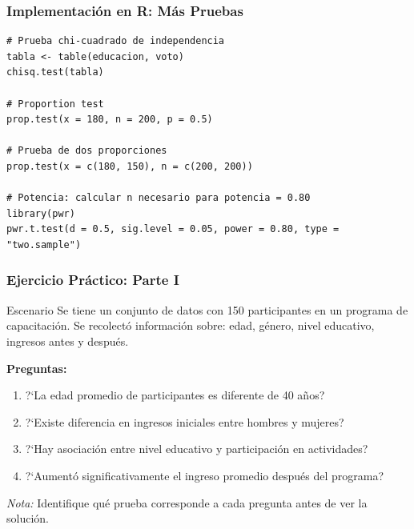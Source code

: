 \documentclass[aspectratio=169,11pt]{beamer}
\begin{document}
\begin{frame}[fragile]
  \frametitle{Implementaci\'on en R: M\'as Pruebas}
  \tiny
  \begin{lstlisting}
# Prueba chi-cuadrado de independencia
tabla <- table(educacion, voto)
chisq.test(tabla)

# Proportion test
prop.test(x = 180, n = 200, p = 0.5)

# Prueba de dos proporciones
prop.test(x = c(180, 150), n = c(200, 200))

# Potencia: calcular n necesario para potencia = 0.80
library(pwr)
pwr.t.test(d = 0.5, sig.level = 0.05, power = 0.80, type = "two.sample")
  \end{lstlisting}
\end{frame}

\begin{frame}
  \frametitle{Ejercicio Pr\'actico: Parte I}
  \small
  \begin{exampleblock}{Escenario}
    Se tiene un conjunto de datos con 150 participantes en un programa de capacitaci\'on.
    Se recolect\'o informaci\'on sobre: edad, g\'enero, nivel educativo, ingresos antes y despu\'es.
  \end{exampleblock}

  \vspace{0.3cm}
  \textbf{Preguntas:}
  \begin{enumerate}
    \setlength{\itemsep}{5pt}
    \item ?`La edad promedio de participantes es diferente de 40 a\~nos?
    \item ?`Existe diferencia en ingresos iniciales entre hombres y mujeres?
    \item ?`Hay asociaci\'on entre nivel educativo y participaci\'on en actividades?
    \item ?`Aument\'o significativamente el ingreso promedio despu\'es del programa?
  \end{enumerate}

  \vspace{0.2cm}
  \textit{Nota:} Identifique qu\'e prueba corresponde a cada pregunta antes de ver la soluci\'on.
\end{frame}
\end{document}
